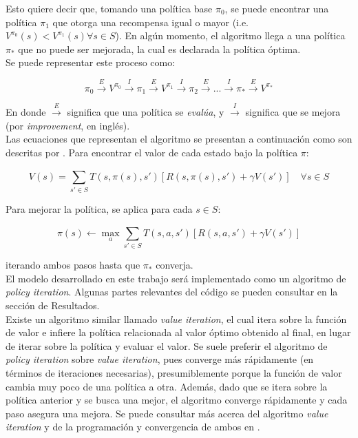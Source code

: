 Esto quiere decir que, tomando una pol\'itica base $\pi_0$, se puede encontrar una pol\'itica $\pi_1$ que otorga una recompensa igual o mayor (i.e. $V^{\pi_0}(s)<V^{\pi_1}(s) \forall s \in S$). En alg\'un momento, el algoritmo llega a una pol\'itica $\pi_{*}$ que no puede ser mejorada, la cual es declarada la pol\'itica \'optima.\\


Se puede representar este proceso como:

$$
\pi_0 \overset{E}{\rightarrow} V^{\pi_{0}} \overset{I}{\rightarrow}
\pi_1 \overset{E}{\rightarrow} V^{\pi_{1}} \overset{I}{\rightarrow}
\pi_2 \overset{E}{\rightarrow} 
...
\overset{I}{\rightarrow} \pi_{*} \overset{E}{\rightarrow} V^{\pi_{*}}
$$

En donde $\overset{E}{\rightarrow}$ significa que una pol\'itica se \textit{eval\'ua}, y $\overset{I}{\rightarrow}$ significa que se mejora (por \textit{improvement}, en ingl\'es). \\

Las ecuaciones que representan el algoritmo se presentan a continuaci\'on como son descritas por \citet{Frazzoli}. Para encontrar el valor de cada estado bajo la pol\'itica $\pi$:

$$
V(s) = \sum_{s' \in S}^{ } T(s, \pi(s), s')[R(s, \pi(s), s') + \gamma V(s')] \quad \forall s \in S
$$

Para mejorar la pol\'itica, se aplica para cada $s \in S$:

$$
\pi(s) \leftarrow \max_a \sum_{s' \in S}^{ }T(s,a,s')[R(s,a,s') + \gamma V(s')]
$$

iterando ambos pasos hasta que $\pi_*$ converja.\\

El modelo desarrollado en este trabajo ser\'a implementado como un algoritmo de \textit{policy iteration}. Algunas partes relevantes del c\'odigo se pueden consultar en la secci\'on de Resultados.\\

Existe un algoritmo similar llamado \textit{value iteration}, el cual itera sobre la funci\'on de valor e infiere la pol\'itica relacionada al valor \'optimo obtenido al final, en lugar de iterar sobre la pol\'itica y evaluar el valor. Se suele preferir el algoritmo de \textit{policy iteration} sobre \textit{value iteration}, pues converge m\'as r\'apidamente (en t\'erminos de iteraciones necesarias), presumiblemente porque la funci\'on de valor cambia muy poco de una pol\'itica a otra. Adem\'as, dado que se itera sobre la pol\'itica anterior y se busca una mejor, el algoritmo converge r\'apidamente y cada paso asegura una mejora. Se puede consultar m\'as acerca del algoritmo \textit{value iteration} y de la programaci\'on y convergencia de ambos en \citet{Sutton}.

